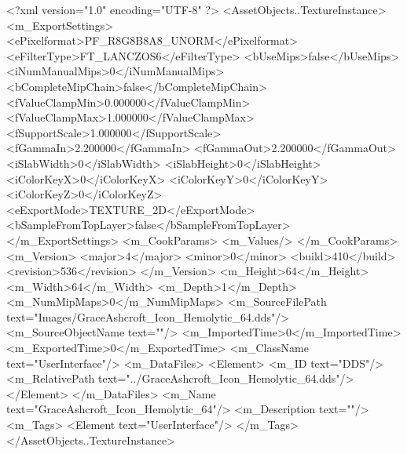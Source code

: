 <?xml version="1.0" encoding="UTF-8" ?>
<AssetObjects..TextureInstance>
	<m_ExportSettings>
		<ePixelformat>PF_R8G8B8A8_UNORM</ePixelformat>
		<eFilterType>FT_LANCZOS6</eFilterType>
		<bUseMips>false</bUseMips>
		<iNumManualMips>0</iNumManualMips>
		<bCompleteMipChain>false</bCompleteMipChain>
		<fValueClampMin>0.000000</fValueClampMin>
		<fValueClampMax>1.000000</fValueClampMax>
		<fSupportScale>1.000000</fSupportScale>
		<fGammaIn>2.200000</fGammaIn>
		<fGammaOut>2.200000</fGammaOut>
		<iSlabWidth>0</iSlabWidth>
		<iSlabHeight>0</iSlabHeight>
		<iColorKeyX>0</iColorKeyX>
		<iColorKeyY>0</iColorKeyY>
		<iColorKeyZ>0</iColorKeyZ>
		<eExportMode>TEXTURE_2D</eExportMode>
		<bSampleFromTopLayer>false</bSampleFromTopLayer>
	</m_ExportSettings>
	<m_CookParams>
		<m_Values/>
	</m_CookParams>
	<m_Version>
		<major>4</major>
		<minor>0</minor>
		<build>410</build>
		<revision>536</revision>
	</m_Version>
	<m_Height>64</m_Height>
	<m_Width>64</m_Width>
	<m_Depth>1</m_Depth>
	<m_NumMipMaps>0</m_NumMipMaps>
	<m_SourceFilePath text="Images/GraceAshcroft_Icon_Hemolytic_64.dds"/>
	<m_SourceObjectName text=""/>
	<m_ImportedTime>0</m_ImportedTime>
	<m_ExportedTime>0</m_ExportedTime>
	<m_ClassName text="UserInterface"/>
	<m_DataFiles>
		<Element>
			<m_ID text="DDS"/>
			<m_RelativePath text="../GraceAshcroft_Icon_Hemolytic_64.dds"/>
		</Element>
	</m_DataFiles>
	<m_Name text="GraceAshcroft_Icon_Hemolytic_64"/>
	<m_Description text=""/>
	<m_Tags>
		<Element text="UserInterface"/>
	</m_Tags>
</AssetObjects..TextureInstance>
